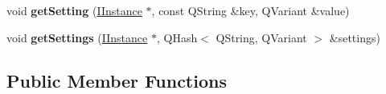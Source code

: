 \begin{DoxyCompactItemize}
\item 
\hypertarget{classInstances_1_1IInstance_ab5dc40987e611bdc3036d59cf077d0e6}{void {\bfseries get\+Setting} (\hyperlink{classInstances_1_1IInstance}{I\+Instance} $\ast$, const Q\+String \&key, Q\+Variant \&value)}\label{classInstances_1_1IInstance_ab5dc40987e611bdc3036d59cf077d0e6}

\item 
\hypertarget{classInstances_1_1IInstance_a71691d22518c4f60f557c39c44de35b8}{void {\bfseries get\+Settings} (\hyperlink{classInstances_1_1IInstance}{I\+Instance} $\ast$, Q\+Hash$<$ Q\+String, Q\+Variant $>$ \&settings)}\label{classInstances_1_1IInstance_a71691d22518c4f60f557c39c44de35b8}

\end{DoxyCompactItemize}
\subsection*{Public Member Functions}

